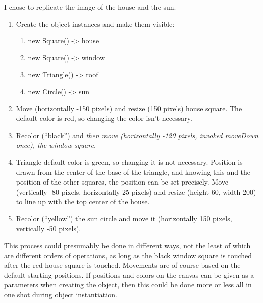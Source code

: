 I chose to replicate the image of the house and the sun.

\begin{enumerate}
	\item Create the object instances and make them visible:
		\begin{enumerate}
			\item new Square() -> house
			\item new Square() -> window
			\item new Triangle() -> roof
			\item new Circle() -> sun
		\end{enumerate}
	\item Move (horizontally -150 pixels) and resize (150 pixels)
		house square. The default color is red, so changing the
		color isn't necessary.
	\item Recolor (``black'') and \em{then} move (horizontally -120
		pixels, invoked moveDown once), the window square.
	\item Triangle default color is green, so changing it is not
		necessary. Position is drawn from the center of the base
		of the triangle, and knowing this and the position of
		the other squares, the position can be set precisely.
		Move (vertically -80 pixels, horizontally 25 pixels) and
		resize (height 60, width 200) to line up with the top
		center of the house.
	\item Recolor (``yellow'') the sun circle and move it
		(horizontally 150 pixels, vertically -50 pixels).
\end{enumerate}

This process could presumably be done in different ways, not the least
of which are different orders of operations, as long as the black window
square is touched after the red house square is touched. Movements are
of course based on the default starting positions. If positions and
colors on the canvas can be given as a parameters when creating the
object, then this could be done more or less all in one shot during
object instantiation.
